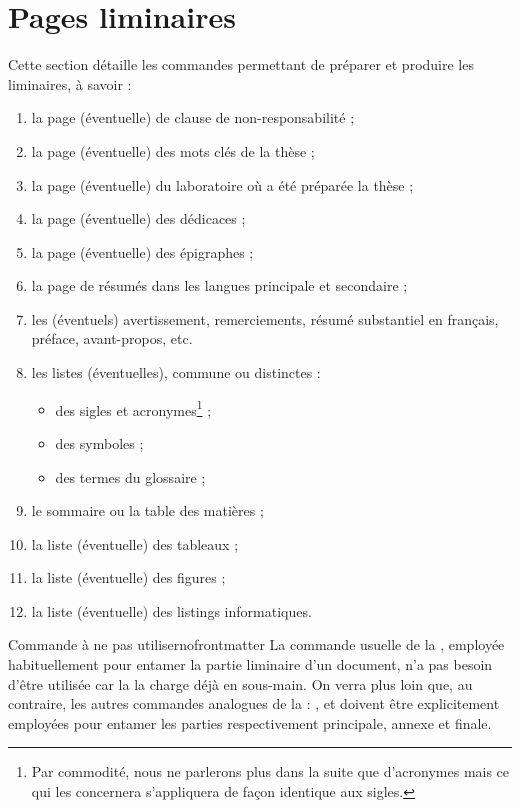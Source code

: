 \chapter{Pages liminaires}\label{cha:liminaires}

Cette section détaille les commandes permettant de préparer et produire les
\glspl{liminaire}, à savoir :
\begin{enumerate}
\item la page (éventuelle) de clause de non-responsabilité ;
\item la page (éventuelle) des mots clés de la thèse ;
\item la page (éventuelle) du laboratoire où a été préparée la thèse ;
\item la page (éventuelle) des dédicaces ;
\item la page (éventuelle) des épigraphes ;
\item la page de résumés dans les langues principale et secondaire ;
\item les (éventuels) avertissement, remerciements, résumé substantiel en
  français, préface, avant-propos, etc.
\item les listes (éventuelles), commune ou distinctes :
  \begin{itemize}
  \item des sigles et acronymes\footnote{Par commodité, nous ne parlerons plus
      dans la suite que d'acronymes mais ce qui les concernera s'appliquera de
      façon identique aux sigles.} ;
  \item des symboles ;
  \item des termes du glossaire ;
  \end{itemize}
\item le sommaire ou la table des matières ;
\item la liste (éventuelle) des tableaux ;
\item la liste (éventuelle) des figures ;
\item la liste (éventuelle) des listings informatiques.
\end{enumerate}

\begin{dbremark}{Commande \protect{} à ne pas utiliser}{nofrontmatter}
  La commande  usuelle de la , employée
  habituellement pour entamer la partie liminaire d'un document, n'a pas besoin
  d'être utilisée car la \yatcl{} la charge déjà en sous-main. On verra plus
  loin que, au contraire, les autres commandes analogues de la  :
  ,  et  doivent être
  explicitement employées pour entamer les parties respectivement principale,
  annexe et finale.
\end{dbremark}

